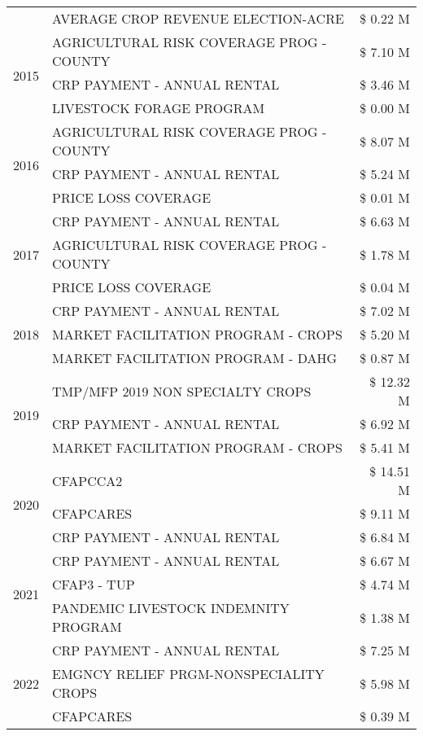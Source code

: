 \begin{tabular}{llr}
 & AVERAGE CROP REVENUE ELECTION-ACRE & \$ 0.22 M \\
\cline{1-3}
\multirow[t]{3}{*}{2015} & AGRICULTURAL RISK COVERAGE PROG - COUNTY & \$ 7.10 M \\
 & CRP PAYMENT - ANNUAL RENTAL & \$ 3.46 M \\
 & LIVESTOCK FORAGE PROGRAM & \$ 0.00 M \\
\cline{1-3}
\multirow[t]{3}{*}{2016} & AGRICULTURAL RISK COVERAGE PROG - COUNTY & \$ 8.07 M \\
 & CRP PAYMENT - ANNUAL RENTAL & \$ 5.24 M \\
 & PRICE LOSS COVERAGE & \$ 0.01 M \\
\cline{1-3}
\multirow[t]{3}{*}{2017} & CRP PAYMENT - ANNUAL RENTAL & \$ 6.63 M \\
 & AGRICULTURAL RISK COVERAGE PROG - COUNTY & \$ 1.78 M \\
 & PRICE LOSS COVERAGE & \$ 0.04 M \\
\cline{1-3}
\multirow[t]{3}{*}{2018} & CRP PAYMENT - ANNUAL RENTAL & \$ 7.02 M \\
 & MARKET FACILITATION PROGRAM - CROPS & \$ 5.20 M \\
 & MARKET FACILITATION PROGRAM - DAHG & \$ 0.87 M \\
\cline{1-3}
\multirow[t]{3}{*}{2019} & TMP/MFP 2019 NON SPECIALTY CROPS & \$ 12.32 M \\
 & CRP PAYMENT - ANNUAL RENTAL & \$ 6.92 M \\
 & MARKET FACILITATION PROGRAM - CROPS & \$ 5.41 M \\
\cline{1-3}
\multirow[t]{3}{*}{2020} & CFAPCCA2 & \$ 14.51 M \\
 & CFAPCARES & \$ 9.11 M \\
 & CRP PAYMENT - ANNUAL RENTAL & \$ 6.84 M \\
\cline{1-3}
\multirow[t]{3}{*}{2021} & CRP PAYMENT - ANNUAL RENTAL & \$ 6.67 M \\
 & CFAP3 - TUP & \$ 4.74 M \\
 & PANDEMIC LIVESTOCK INDEMNITY PROGRAM & \$ 1.38 M \\
\cline{1-3}
\multirow[t]{3}{*}{2022} & CRP PAYMENT - ANNUAL RENTAL & \$ 7.25 M \\
 & EMGNCY RELIEF PRGM-NONSPECIALITY CROPS & \$ 5.98 M \\
 & CFAPCARES & \$ 0.39 M \\
\cline{1-3}
\bottomrule
\end{tabular}
